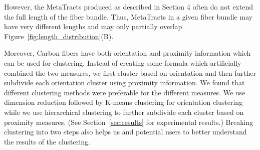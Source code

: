 However, the MetaTracts produced as described in Section 4 often do not extend the full length of the fiber bundle.  Thus, MetaTracts
in a given fiber bundle may have very different lengths and may only partially overlap Figure~\ref{fig:length_distribution}(B).

Moreover, Carbon fibers have both orientation and proximity information which can be used for clustering. Instead of creating some formula
which artificially combined the two measures,  we first cluster based on orientation and then further subdivide each orientation cluster using proximity information. We found that different clustering methods were preferable
for the different measures. We use dimension reduction followed by K-means clustering
for orientation clustering while we use hierarchical clustering to further subdivide each cluster
based on proximity measures. (See Section~\ref{sec:results} for experimental results.) Breaking clustering into two steps also helps us and potential users
to better understand the results of the clustering.








